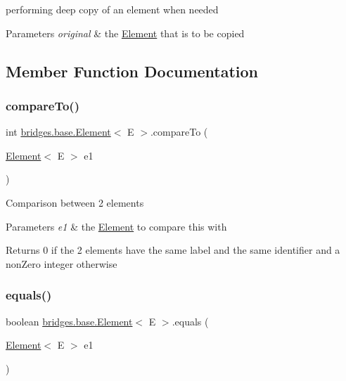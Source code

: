 performing deep copy of an element when needed


\begin{DoxyParams}{Parameters}
{\em original} & the \mbox{\hyperlink{classbridges_1_1base_1_1_element}{Element}} that is to be copied \\
\hline
\end{DoxyParams}


\subsection{Member Function Documentation}
\mbox{\label{classbridges_1_1base_1_1_element_a6cd4c4f15c6a4f87f59e443cffe87a20}} 
\subsubsection{\texorpdfstring{compare\+To()}{compareTo()}}
{\footnotesize\ttfamily int \mbox{\hyperlink{classbridges_1_1base_1_1_element}{bridges.\+base.\+Element}}$<$ E $>$.compare\+To (\begin{DoxyParamCaption}\item[{\mbox{\hyperlink{classbridges_1_1base_1_1_element}{Element}}$<$ E $>$}]{e1 }\end{DoxyParamCaption})}

Comparison between 2 elements 
\begin{DoxyParams}{Parameters}
{\em e1} & the \mbox{\hyperlink{classbridges_1_1base_1_1_element}{Element}} to compare this with \\
\hline
\end{DoxyParams}
\begin{DoxyReturn}{Returns}
0 if the 2 elements have the same label and the same identifier and a non\+Zero integer otherwise 
\end{DoxyReturn}
\mbox{\label{classbridges_1_1base_1_1_element_aff10d60700eb1aceca5c0b519bdccccb}} 
\subsubsection{\texorpdfstring{equals()}{equals()}}
{\footnotesize\ttfamily boolean \mbox{\hyperlink{classbridges_1_1base_1_1_element}{bridges.\+base.\+Element}}$<$ E $>$.equals (\begin{DoxyParamCaption}\item[{\mbox{\hyperlink{classbridges_1_1base_1_1_element}{Element}}$<$ E $>$}]{e1 }\end{DoxyParamCaption})}

